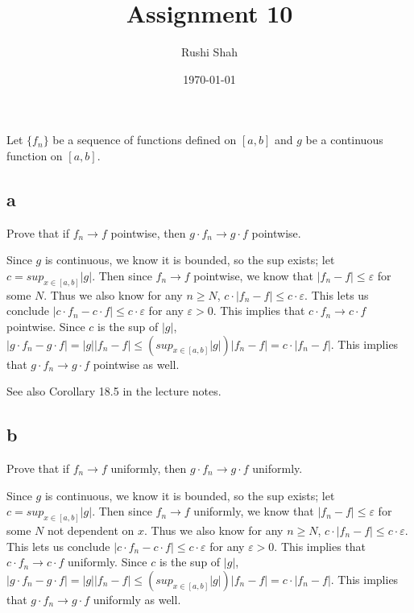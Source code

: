 \documentclass[]{article}
\author{Rushi Shah}
\date{\today}
\title{Assignment 10}
\begin{document}
	\maketitle

	\section{}
		\begin{em}
			Let $\{f_n\}$ be a sequence of functions defined on $[a, b]$ and $g$ be a continuous function on $[a, b]$. 
		\end{em}

		\subsection*{a}
		\begin{em}
			Prove that if $f_n \to f$ pointwise, then $g \cdot f_n \to g \cdot f$ pointwise. 
		\end{em}

			Since $g$ is continuous, we know it is bounded, so the sup exists; let $c = sup_{x \in [a, b]}|g|$. Then since $f_n \to f$ pointwise, we know that $|f_n - f| \leq \varepsilon$ for some $N$. Thus we also know for any $n \geq N$, $c \cdot |f_n - f| \leq c \cdot \varepsilon$. This lets us conclude $|c \cdot f_n - c \cdot f| \leq c \cdot \varepsilon$ for any $\varepsilon > 0$. This implies that $c \cdot f_n \to c \cdot f$ pointwise. Since $c$ is the sup of $|g|$, $|g \cdot f_n - g \cdot f| = |g||f_n -f| \leq (sup_{x \in [a,b]} |g|)|f_n - f| = c \cdot |f_n - f|$. This implies that $g \cdot f_n \to g \cdot f$ pointwise as well.


			See also Corollary 18.5 in the lecture notes. 

		\subsection*{b}
			\begin{em}
				Prove that if $f_n \to f$ uniformly, then $g \cdot f_n \to g \cdot f$ uniformly.
			\end{em}

			Since $g$ is continuous, we know it is bounded, so the sup exists; let $c = sup_{x \in [a, b]}|g|$. Then since $f_n \to f$ uniformly, we know that $|f_n - f| \leq \varepsilon$ for some $N$ not dependent on $x$. Thus we also know for any $n \geq N$, $c \cdot |f_n - f| \leq c \cdot \varepsilon$. This lets us conclude $|c \cdot f_n - c \cdot f| \leq c \cdot \varepsilon$ for any $\varepsilon > 0$. This implies that $c \cdot f_n \to c \cdot f$ uniformly. Since $c$ is the sup of $|g|$, $|g \cdot f_n - g \cdot f| = |g||f_n -f| \leq (sup_{x \in [a,b]} |g|)|f_n - f| = c \cdot |f_n - f|$. This implies that $g \cdot f_n \to g \cdot f$ uniformly as well.
\end{document}

